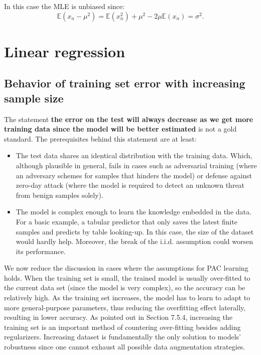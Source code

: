 \documentclass[UTF8]{ctexart}
\begin{document}
In this case the MLE is unbiased since:
$$\mathbb{E}(x_{n}-\mu^{2})=\mathbb{E}(x_{n}^{2})+\mu^{2}-2\mu\mathbb{E}(x_{n})=\sigma^{2}.$$




\newpage
\section{Linear regression}
\subsection{Behavior of training set error with increasing sample size}
The statement \textbf{the error on the test will always decrease as we get more training data since the model will be better estimated} is not a gold standard.
The prerequisites behind this statement are at least:
\begin{itemize}
\item The test data shares an identical distribution with the training data.
Which, although plausible in general, fails in cases such as adversarial training (where an adversary schemes for samples that hinders the model) or defense against zero-day attack (where the model is required to detect an unknown threat from benign samples solely).
\item The model is complex enough to learn the knowledge embedded in the data.
For a basic example, a tabular predictor that only saves the latest finite samples and predicts by table looking-up.
In this case, the size of the dataset would hardly help.
Moreover, the break of the i.i.d. assumption could worsen its performance.
\end{itemize}
We now reduce the discussion in cases where the assumptions for PAC learning holds.
When the training set is small, the trained model is usually over-fitted to the current data set (since the model is very complex), so the accuracy can be relatively high.
As the training set increases, the model has to learn to adapt to more general-purpose parameters, thus reducing the overfitting effect laterally, resulting in lower accuracy.
As pointed out in Section 7.5.4, increasing the training set is an important method of countering over-fitting besides adding regularizers.
Increasing dataset is fundamentally the only solution to models' robustness since one cannot exhaust all possible data augmentation strategies.
\end{document}
